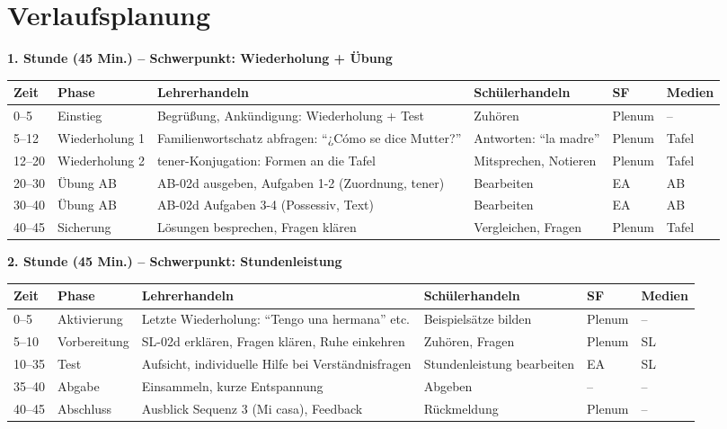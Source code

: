 \documentclass[11pt,a4paper]{article}
\begin{document}
\section{Verlaufsplanung}

\textbf{1. Stunde (45 Min.) -- Schwerpunkt: Wiederholung + Übung}

\begin{longtable}{|p{1cm}|p{1.5cm}|p{4cm}|p{3cm}|p{2cm}|p{2cm}|}
\hline
\textbf{Zeit} & \textbf{Phase} & \textbf{Lehrerhandeln} & \textbf{Schülerhandeln} & \textbf{SF} & \textbf{Medien} \\
\hline
\endhead

0--5 & Einstieg & Begrüßung, Ankündigung: Wiederholung + Test & Zuhören & Plenum & -- \\
\hline

5--12 & Wieder\-holung 1 & Familienwortschatz abfragen: ``¿Cómo se dice Mutter?'' & Antworten: ``la madre'' & Plenum & Tafel \\
\hline

12--20 & Wieder\-holung 2 & tener-Konjugation: Formen an die Tafel & Mitsprechen, Notieren & Plenum & Tafel \\
\hline

20--30 & Übung AB & AB-02d ausgeben, Aufgaben 1-2 (Zuordnung, tener) & Bearbeiten & EA & AB \\
\hline

30--40 & Übung AB & AB-02d Aufgaben 3-4 (Possessiv, Text) & Bearbeiten & EA & AB \\
\hline

40--45 & Sicherung & Lösungen besprechen, Fragen klären & Vergleichen, Fragen & Plenum & Tafel \\
\hline
\end{longtable}

\vspace{1em}

\textbf{2. Stunde (45 Min.) -- Schwerpunkt: Stundenleistung}

\begin{longtable}{|p{1cm}|p{1.5cm}|p{4cm}|p{3cm}|p{2cm}|p{2cm}|}
\hline
\textbf{Zeit} & \textbf{Phase} & \textbf{Lehrerhandeln} & \textbf{Schülerhandeln} & \textbf{SF} & \textbf{Medien} \\
\hline
\endhead

0--5 & Aktivierung & Letzte Wiederholung: ``Tengo una hermana'' etc. & Beispielsätze bilden & Plenum & -- \\
\hline

5--10 & Vorbereitung & SL-02d erklären, Fragen klären, Ruhe einkehren & Zuhören, Fragen & Plenum & SL \\
\hline

10--35 & Test & Aufsicht, individuelle Hilfe bei Verständnisfragen & Stundenleistung bearbeiten & EA & SL \\
\hline

35--40 & Abgabe & Einsammeln, kurze Entspannung & Abgeben & -- & -- \\
\hline

40--45 & Abschluss & Ausblick Sequenz 3 (Mi casa), Feedback & Rückmeldung & Plenum & -- \\
\hline
\end{longtable}
\end{document}
